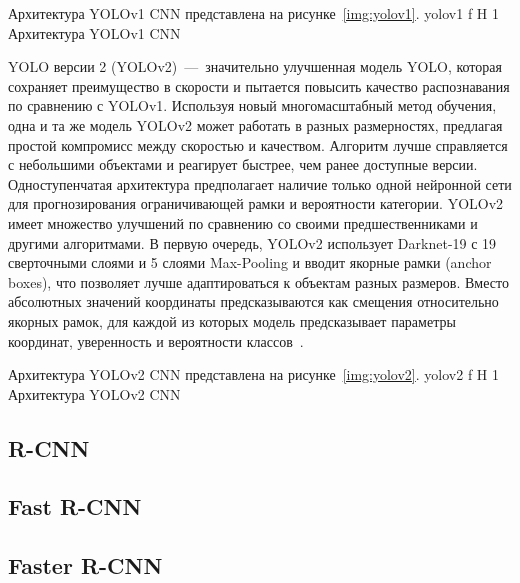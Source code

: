 Архитектура YOLOv1 CNN представлена на рисунке~\ref{img:yolov1}.
	{yolov1}
	{f}
	{H}
	{1\textwidth}
	{Архитектура YOLOv1 CNN}

YOLO версии 2 (YOLOv2)~---~значительно улучшенная модель YOLO, которая сохраняет преимущество в скорости и пытается повысить качество распознавания по сравнению с YOLOv1.
Используя новый многомасштабный метод обучения, одна и та же модель YOLOv2 может работать в разных размерностях, предлагая простой компромисс между скоростью и качеством.
Алгоритм лучше справляется с небольшими объектами и реагирует быстрее, чем ранее доступные версии.
Одноступенчатая архитектура предполагает наличие только одной нейронной сети для прогнозирования ограничивающей рамки и вероятности категории.
YOLOv2 имеет множество улучшений по сравнению со своими предшественниками и другими алгоритмами.
В первую очередь, YOLOv2 использует Darknet-19 с 19 сверточными слоями и 5 слоями Max-Pooling и вводит якорные рамки (anchor boxes), что позволяет лучше адаптироваться к объектам разных размеров.
Вместо абсолютных значений координаты предсказываются как смещения относительно якорных рамок, для каждой из которых модель предсказывает параметры координат, уверенность и вероятности классов~\cite{yolochina, yolobase}.

Архитектура YOLOv2 CNN представлена на рисунке~\ref{img:yolov2}.
	{yolov2}
	{f}
	{H}
	{1\textwidth}
	{Архитектура YOLOv2 CNN}

\subsection{R-CNN}

\subsection{Fast R-CNN}

\subsection{Faster R-CNN}